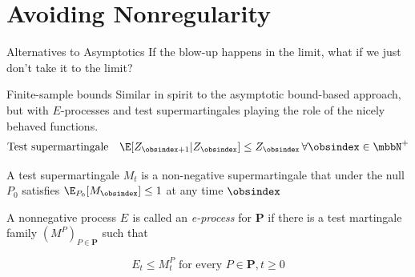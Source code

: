 \documentclass[aspectratio=169, professionalfonts]{beamer}
\newcommand{\prode}[2]{E_{#1}^{#2}}
\begin{document}



\section{Avoiding Nonregularity}
\begin{frame}{Alternatives to Asymptotics}
	If the blow-up happens in the limit, what if we just don't take it to the limit?
\end{frame}

\begin{frame}{Finite-sample bounds}
	Similar in spirit to the asymptotic bound-based approach, but with
	$E$-processes and test	supermartingales playing the role of the nicely behaved functions.
	\vfill
	\[\text{Test supermartingale} \quad \E[Z_{\obsindex + 1} | Z_{\obsindex}] \leq
		Z_{\obsindex} \, \forall \obsindex \in \mbbN^+ \]

	\vfill \pause

	A test supermartingale $M_t$ is a non-negative supermartingale that under
	the null $P_0$ satisfies $\E_{P_0}[M_\obsindex] \leq 1$ at any time $\obsindex$

	\vfill \pause

	A nonnegative process $\prode{}{}$ is called an \emph{e-process} for $\symbf{P}$
	if there is a test martingale family $(M^P)_{P \in \symbf{P}}$ such that

	$$\prode{t}{} \leq M_{t}^{P} \text{ for every } P \in \symbf{P},  t \geq 0$$
\end{frame}


\end{document}

